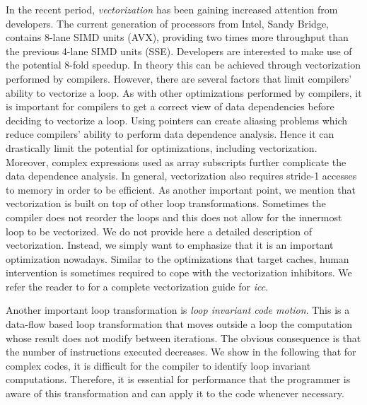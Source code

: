 In the recent period, \textit{vectorization} has been gaining increased
attention from developers. The current generation of processors from Intel, Sandy Bridge,
contains 8-lane SIMD units (AVX), providing two times more throughput than the
previous 4-lane SIMD units (SSE). Developers are interested to make use of the
potential 8-fold speedup. In theory this can be achieved through vectorization
performed by compilers. However, there are several factors that limit compilers'
ability to vectorize a loop. As with other optimizations performed by compilers,
it is important for compilers to get a correct view of data dependencies before
deciding to vectorize a loop. Using pointers can create aliasing problems which
reduce compilers' ability to perform data dependence analysis. Hence it can
drastically limit the potential for optimizations, including vectorization.
Moreover, complex expressions used as array subscripts further complicate the
data dependence analysis. In general, vectorization also requires stride-1
accesses to memory in order to be efficient. As another important point, we
mention that vectorization is built on top of other loop transformations.
Sometimes the compiler does not reorder the loops and this does not allow for
the innermost loop to be vectorized.
We do not provide here a detailed description of vectorization. Instead, we
simply want to emphasize that it is an important optimization nowadays. Similar
to the optimizations that target caches, human intervention is sometimes
required to cope with the vectorization inhibitors. We refer the reader to
\cite{vec_guide} for a complete vectorization guide for \textit{icc}.

Another important loop transformation is \textit{loop invariant code motion}.
This is a data-flow based loop transformation that moves outside a loop the computation
whose result does not modify between iterations.
The obvious consequence is that the number of instructions executed decreases. 
We show in the following that for complex codes, it is difficult for the
compiler to identify loop invariant computations. Therefore, it is essential for
performance that the programmer is aware of this transformation and can apply it
to the code whenever necessary.

